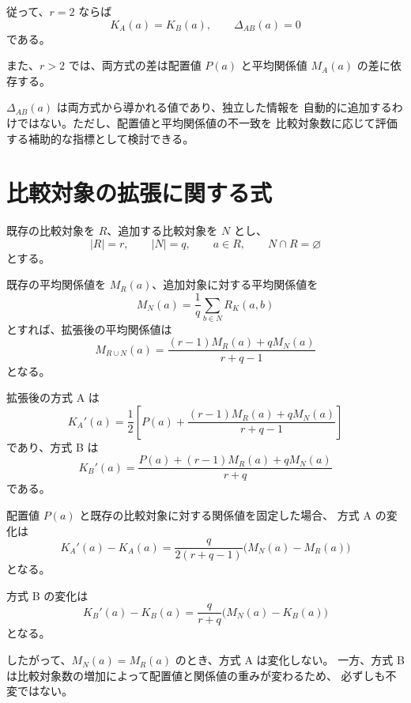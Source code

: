 \documentclass[a4paper,11pt]{ltjsarticle}
\begin{document}
従って、$r=2$ ならば
\begin{equation}
  K_A(a)=K_B(a),\qquad \Delta_{AB}(a)=0
\end{equation}
である。

また、$r>2$ では、両方式の差は配置値 $P(a)$ と平均関係値
$M_A(a)$ の差に依存する。

$\Delta_{AB}(a)$ は両方式から導かれる値であり、独立した情報を
自動的に追加するわけではない。ただし、配置値と平均関係値の不一致を
比較対象数に応じて評価する補助的な指標として検討できる。

\section{比較対象の拡張に関する式}

既存の比較対象を $R$、追加する比較対象を $N$ とし、
\begin{equation}
  |R|=r,\qquad |N|=q,\qquad
  a\in R,\qquad N\cap R=\varnothing
\end{equation}
とする。

既存の平均関係値を $M_R(a)$、追加対象に対する平均関係値を
\begin{equation}
  M_N(a)=\frac1q\sum_{b\in N}R_K(a,b)
\end{equation}
とすれば、拡張後の平均関係値は
\begin{equation}
  M_{R\cup N}(a)
  =
  \frac{(r-1)M_R(a)+qM_N(a)}{r+q-1}
\end{equation}
となる。

拡張後の方式 A は
\begin{equation}
  K_A'(a)
  =
  \frac12
  \left[
    P(a)+
    \frac{(r-1)M_R(a)+qM_N(a)}{r+q-1}
  \right]
\end{equation}
であり、方式 B は
\begin{equation}
  K_B'(a)
  =
  \frac{
    P(a)+(r-1)M_R(a)+qM_N(a)
  }{r+q}
\end{equation}
である。

配置値 $P(a)$ と既存の比較対象に対する関係値を固定した場合、
方式 A の変化は
\begin{equation}
  \boxed{
  K_A'(a)-K_A(a)
  =
  \frac{q}{2(r+q-1)}
  \bigl(M_N(a)-M_R(a)\bigr)
  }
\end{equation}
となる。

方式 B の変化は
\begin{equation}
  \boxed{
  K_B'(a)-K_B(a)
  =
  \frac{q}{r+q}
  \bigl(M_N(a)-K_B(a)\bigr)
  }
\end{equation}
となる。

したがって、$M_N(a)=M_R(a)$ のとき、方式 A は変化しない。
一方、方式 B は比較対象数の増加によって配置値と関係値の重みが変わるため、
必ずしも不変ではない。
\end{document}

